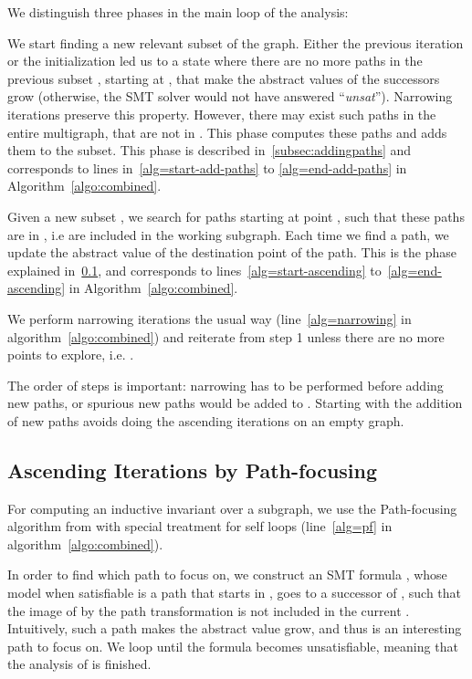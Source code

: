 We distinguish three phases in the main loop of the analysis:
\begin{compactenum}
\item \label{step:addingpaths} We start finding a new relevant subset
   of the graph.
  Either the previous iteration or the initialization led us to a
  state where there are no more paths in the previous subset ,
  starting at , that make the abstract values of the successors
  grow (otherwise, the SMT solver would not have answered
  ``\emph{unsat}''). Narrowing iterations preserve this property.
  However, there may exist such paths in the entire multigraph, that
  are not in . This phase computes these paths and adds them to
  the subset. This phase is described in~\ref{subsec:addingpaths}
  and corresponds to lines in~\ref{alg=start-add-paths} to
  \ref{alg=end-add-paths} in Algorithm~\ref{algo:combined}.
\item \label{step:ascending} Given a new subset , we search for paths starting at point
  , such that these paths are in , i.e are included in
  the working subgraph. Each time we find a path, we update the
  abstract value of the destination point of the path. This is the
  phase explained in~\ref{subsec:ascending}, and corresponds to
  lines~\ref{alg=start-ascending} to~\ref{alg=end-ascending} in
  Algorithm~\ref{algo:combined}.
\item  \label{step:narrowing} We perform narrowing iterations the usual way
  (line~\ref{alg=narrowing} in algorithm~\ref{algo:combined}) and
  reiterate from step 1 unless there are no more points to explore,
  i.e. .
\end{compactenum}

The order of steps is important: narrowing has to be performed before
adding new paths, or spurious new paths would be added to .
Starting with the addition of new paths avoids
doing the ascending iterations on an empty graph.

\subsection{Ascending Iterations by Path-focusing}
\label{subsec:ascending}



For computing an inductive invariant over a subgraph, we use the
Path-focusing algorithm from \cite{Monniaux_Gonnord_SAS11} with special
treatment for self loops (line~\ref{alg=pf} in algorithm~\ref{algo:combined}).

In order to find which path to focus on, we construct an SMT formula , whose
model when satisfiable is a path that starts in , goes to a successor  of , such that the image of  by the path transformation
is not included in the current .
Intuitively, such a path makes the abstract value  grow, and thus is
an interesting path to focus on. We loop until the formula becomes unsatisfiable,
meaning that the analysis of  is finished.

